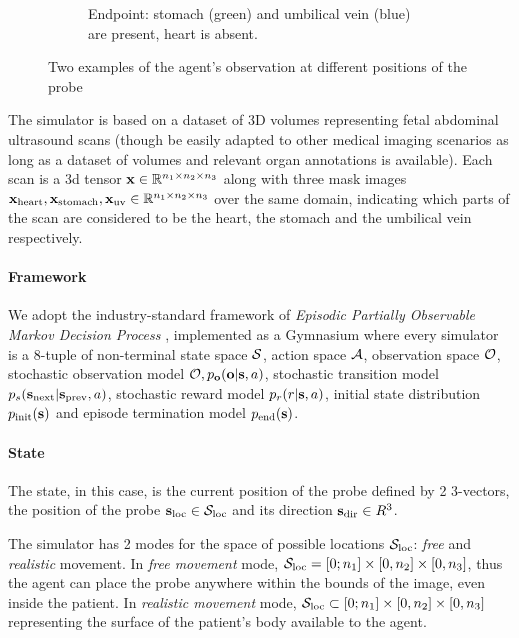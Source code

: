 \begin{figure}
\begin{subfigure}{.45\linewidth}
      \caption{Endpoint: stomach (green) and umbilical vein (blue) are present, heart is absent.}
      \label{fig:img-after}
    \end{subfigure}
    \caption{Two examples of the agent's observation at different positions of the probe}
    \label{fig:imgs}
\end{figure}

The simulator is based on a dataset of 3D volumes representing fetal abdominal ultrasound scans (though be easily adapted to other medical imaging scenarios as long as a dataset of volumes and relevant organ annotations is available).
Each scan is a 3d tensor $\mathbf{x} \in \mathbb{R}^{n_1 \times n_2 \times n_3}$ along with three mask images $\mathbf{x}_\text{heart}, \mathbf{x}_\text{stomach}, \mathbf{x}_\text{uv} \in \mathbb{R}^{n_1 \times n_2 \times n_3}$ over the same domain, indicating which parts of the scan are considered to be the heart, the stomach and the umbilical vein respectively.

\paragraph{Framework}

We adopt the industry-standard framework of {\em Episodic Partially Observable Markov Decision Process} \cite{kramerjdavidrPartiallyObservableMarkov1964, spaanPartiallyObservableMarkov2012}, implemented as a Gymnasium \cite{towersGymnasiumStandardInterface2024} where every simulator is a 8-tuple of non-terminal state space $\mathcal{S}$, action space $\mathcal{A}$, observation space $\mathcal{O}$, stochastic observation model $\mathcal{O}, p_{\mathbf{o}}(\mathbf{o} | \textbf{s}, a)$, stochastic transition model $p_s(\textbf{s}_\text{next} | \textbf{s}_\text{prev}, a)$, stochastic reward model $p_r(r | \textbf{s}, a)$, initial state distribution $p_\text{init}(\textbf{s})$ and episode termination model $p_\text{end}(\textbf{s})$.

\paragraph{State}

The state, in this case, is the current position of the probe defined by 2 3-vectors, the position of the probe $\textbf{s}_\text{loc} \in \mathcal{S}_\text{loc}$ and its direction $\textbf{s}_\text{dir} \in R^{3}$.

The simulator has 2 modes for the space of possible locations $\mathcal{S}_\text{loc}$: \emph{free} and \emph{realistic} movement.
In \emph{free movement} mode, $\mathcal{S}_\text{loc} = [0; n_1] \times [0, n_2] \times [0, n_3]$, thus the agent can place the probe anywhere within the bounds of the image, even inside the patient.
In \emph{realistic movement} mode, $\mathcal{S}_\text{loc} \subset [0; n_1] \times [0, n_2] \times [0, n_3]$ representing the surface of the patient's body available to the agent.

